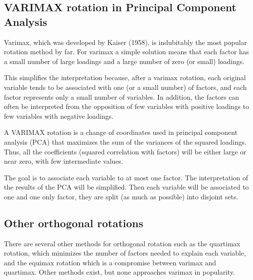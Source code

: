 \subsection{VARIMAX rotation in Principal Component Analysis}
Varimax, which was developed by Kaiser (1958), is indubitably the most
popular rotation method by far. For varimax a simple solution means that each
factor has a small number of large loadings and a large number of zero (or small)
loadings.

This simplifies the interpretation because, after a varimax rotation,
each original variable tends to be associated with one (or a small number) of
factors, and each factor represents only a small number of variables. In addition,
the factors can often be interpreted from the opposition of few variables with
positive loadings to few variables with negative loadings.


A VARIMAX rotation is a change of coordinates used in principal component analysis (PCA) that maximizes the sum of the variances of the squared loadings. Thus, all the coefficients (squared correlation with factors) will be either large or near zero, with few intermediate values.

The goal is to associate each variable to at most one factor. The interpretation of the results of the PCA will be simplified. Then each variable will be associated to one and one only factor, they are split (as much as possible) into disjoint sets.


\subsection{Other orthogonal rotations}
There are several other methods for orthogonal rotation such as the quartimax
rotation, which minimizes the number of factors needed to explain each
variable, and the equimax rotation which is a compromise between varimax
and quartimax. Other methods exist, but none approaches varimax in popularity. 
